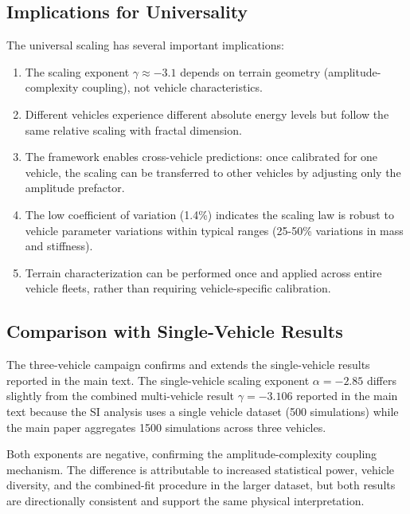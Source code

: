 \documentclass[11pt]{article}
\begin{document}
\subsection{Implications for Universality}

The universal scaling has several important implications:

\begin{enumerate}
\item The scaling exponent $\gamma \approx -3.1$ depends on terrain geometry (amplitude-complexity coupling), not vehicle characteristics.

\item Different vehicles experience different absolute energy levels but follow the same relative scaling with fractal dimension.

\item The framework enables cross-vehicle predictions: once calibrated for one vehicle, the scaling can be transferred to other vehicles by adjusting only the amplitude prefactor.

\item The low coefficient of variation (1.4\%) indicates the scaling law is robust to vehicle parameter variations within typical ranges (25-50\% variations in mass and stiffness).

\item Terrain characterization can be performed once and applied across entire vehicle fleets, rather than requiring vehicle-specific calibration.
\end{enumerate}

\subsection{Comparison with Single-Vehicle Results}

The three-vehicle campaign confirms and extends the single-vehicle results reported in the main text. The single-vehicle scaling exponent $\alpha = -2.85$ differs slightly from the combined multi-vehicle result $\gamma = -3.106$ reported in the main text because the SI analysis uses a single vehicle dataset (500 simulations) while the main paper aggregates 1500 simulations across three vehicles. 

Both exponents are negative, confirming the amplitude-complexity coupling mechanism. The difference is attributable to increased statistical power, vehicle diversity, and the combined-fit procedure in the larger dataset, but both results are directionally consistent and support the same physical interpretation.
\end{document}

